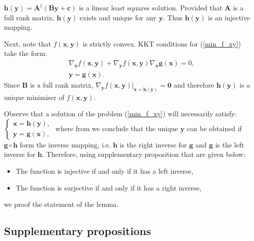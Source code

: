 \documentclass[journal,10pt,onecolumn,draftclsnofoot,]{IEEEtran}
\makeatletter
\theoremstyle{plain}
\theoremstyle{definition}
\theoremstyle{remark}
\renewenvironment{proof}[1][\proofname]{\par
  \pushQED{\qed}%
  \normalfont \topsep6\p@\@plus6\p@\relax
  \list{}{%
    \settowidth{\leftmargin}{\itshape\proofname:\hskip\labelsep}%
    \setlength{\labelwidth}{0pt}%
    \setlength{\itemindent}{-\leftmargin}%
  }%
  \item[\hskip\labelsep\itshape#1\@addpunct{:}]\ignorespaces
}{%
  \popQED\endlist\@endpefalse
}
\makeatother
\begin{document}
\begin{proof}
$\bm{h}(\bm{y}) = \bm{A}^{\dagger} (\bm{B}\bm{y} + \bm{c})$ is a linear least squares solution. Provided that $\bm{A}$ is a full rank matrix, $\bm{h}(\bm{y})$ exists and unique for any $\bm{y}$. Thus $\bm{h}(\bm{y})$ is an injective mapping.

Next, note that $f(\bm{x}, \bm{y})$ is strictly convex. KKT conditions for (\ref{min_f_xy}) take the form:
\begin{equation}
\begin{split}
{}& \nabla_{\bm{x}} f(\bm{x}, \bm{y}) + \nabla_{\bm{y}} f(\bm{x}, \bm{y}) \nabla_{\bm{x}} \bm{g}(\bm{x}) = 0, \\
& \bm{y} = \bm{g}(\bm{x}).
\end{split}
\end{equation}
Since $\bm{B}$ is a full rank matrix, $\nabla_{\bm{y}} f(\bm{x}, \bm{y}) \Big|_{\bm{x} = \bm{h}(\bm{y})} = \bm{0}$ and therefore $\bm{h}(\bm{y})$ is a unique minimiser of $f(\bm{x}, \bm{y})$. 

Observe that a solution of the problem (\ref{min_f_xy}) will necessarily satisfy:
$
\begin{cases}
\bm{x} = \bm{h}(\bm{y}), \\
\bm{y} = \bm{g}(\bm{x}), 
\end{cases}
$
where from we conclude that the unique $\bm{y}$ can be obtained if $\bm{g} \circ \bm{h}$ form the inverse mapping, i.e. $\bm{h}$ is the right inverse for $\bm{g}$ and $\bm{g}$ is the left inverse for $\bm{h}$. Therefore, using supplementary proposition that are given below:
\begin{itemize}
\item The function is injective if and only if it has a left inverse,
\item The function is surjective if and only if it has a right inverse,
\end{itemize}
we proof the statement of the lemma.
\end{proof}

\subsection{Supplementary propositions}
\end{document}
